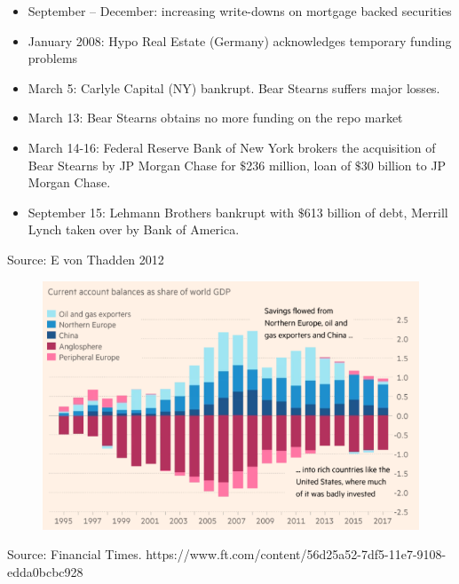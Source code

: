 \documentclass[11pt]{beamer}
\begin{document}
\begin{frame}
\begin{itemize}
\item September – December: increasing write-downs on
mortgage backed securities
\item January 2008: Hypo Real Estate (Germany) acknowledges
temporary funding problems
\item March 5: Carlyle Capital (NY) bankrupt. Bear Stearns suffers major losses.
\item March 13: Bear Stearns obtains no more funding on the repo market
\item March 14-16: Federal Reserve Bank of New York brokers the acquisition of Bear Stearns by JP Morgan Chase for $\$$236 million, loan of $\$$30 billion to JP Morgan Chase.
\item September 15: Lehmann Brothers bankrupt with $\$$613 billion of debt, Merrill Lynch taken over by Bank of America.
\end{itemize}
\tiny{Source: E von Thadden 2012}
\end{frame}


\begin{frame}
\begin{figure}
\includegraphics[width=1\textwidth]{Figures/SavingsGlut.png}
\end{figure}
\tiny{Source: Financial Times. https://www.ft.com/content/56d25a52-7df5-11e7-9108-edda0bcbc928}
\end{frame}
\end{document}
